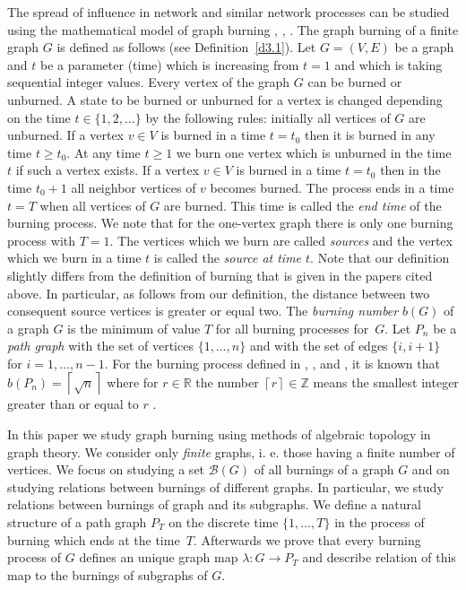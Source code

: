 \documentclass[a4paper, 11pt]{article}
\newcommand{\ceil}[1]{\left \lceil{#1}\right \rceil}
\begin{document}
The spread of  influence  in  network and similar network processes  can be studied using the  mathematical model of graph burning
 \cite{Bonato},  \cite{Burning_2014},  \cite{Bonato_0}.  The graph burning of a finite graph $G$  is defined as follows (see Definition~\ref{d3.1}).  Let $G=(V,E)$ be a graph and $t$ be a parameter (time) which is increasing
from $t=1$ and which  is  taking sequential integer values.  Every vertex of the graph $G$ can be burned or unburned. A state to be burned or unburned for a vertex is changed depending on the time $t\in \{1,2,\dots \}$ by the following rules: initially all 
vertices of $G$ are unburned. If a vertex $v\in V$ is burned in a time $t=t_0$ then it is burned in any time $t\geq t_0$. At any time $t\geq 1$ we burn one  vertex which is unburned in the time  $t$ if such a vertex exists. If a vertex $v\in V$ is burned in a time $t=t_0$  then in the time $t_0+1$ all neighbor vertices of $v$ becomes burned.  The process ends in a time $t=T$ when all vertices of $G$ are burned.  This time is called the \emph{end time}  of the burning process. We note that for the one-vertex graph there is only one burning process  with  $T=1$.   The vertices which we burn are called \emph{sources} and the vertex which we burn in a time $t$ is called the \emph{source at time $t$}.  Note that our definition slightly differs from the definition of burning that is given in the papers cited above. In particular, as follows from our definition, the distance  between two consequent source vertices  is greater or equal two.  The \emph{burning number} $b(G)$ of a graph  $G$ is the minimum of value $T$  for all burning processes for~$G$. Let $P_n$ be a \emph{path graph} with 
the set of vertices $\{1,\dots, n\}$ and with the set of edges
$\{i,i+1\}$ for $i=1, \dots, n-1$. For the burning process defined in  \cite{Bonato},  \cite{Burning_2014}, and  \cite{Bonato_0},  it is known that $b(P_n)=\ceil{\sqrt n}$ where for $r\in \mathbb R$ the number  $\ceil{r}\in \mathbb Z$ means the smallest integer greater than or equal to  $r$ \cite[Th. 2.9]{Bonato_0}. 

In this paper   we study graph burning using methods of algebraic topology in graph theory.  We consider only \emph{finite} graphs, i. e. those having a finite number of vertices.
We focus on studying a  set $\mathcal B(G)$ of all  burnings of a graph $G$ and on studying  relations between burnings of different graphs. In particular, we study relations between burnings of graph and its subgraphs. 
 We define a natural structure of a path graph $P_T$ on the discrete time
 $\{1, \dots, T\}$ in the process of burning which ends at the time~$T$. Afterwards we   prove that every burning process of $G$ defines an unique graph map $\lambda\colon G\to P_T$ and describe relation of this  map  to the  burnings of subgraphs of $G$.    
\end{document}
